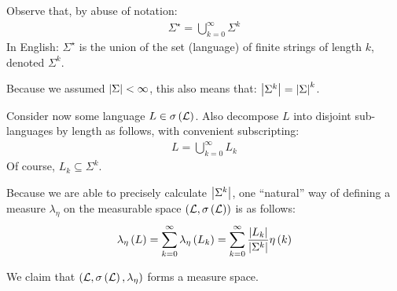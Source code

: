 \documentclass[12pt]{article}
\begin{document}
Observe that, by abuse of notation:
\begin{align*}
  \Sigma^\star =
    \bigcup_{k = 0}^{\infty} \Sigma^k
\end{align*}
In English: \(\Sigma^\star\) is the union of the set (language) of finite
strings of length \(k\), denoted \(\Sigma^k\).

Because we assumed \(\left\lvert\Sigma\right\rvert < \infty\), this also means that:
\(\left\lvert\Sigma^k\right\rvert = \left\lvert\Sigma\right\rvert^k\).

Consider now some language \(L \in \sigma\left(\mathcal{L}\right)\).
Also decompose \(L\) into disjoint sub-languages by length as follows,
with convenient subscripting:
\begin{align*}
  L = \bigcup_{k = 0}^{\infty} L_k
\end{align*}
Of course, \(L_k \subseteq \Sigma^k\).

Because we are able to precisely calculate \(\left\lvert\Sigma^k\right\rvert\),
one ``natural'' way of defining a measure \(\lambda_{\eta}\) on
the measurable space \(\left(\mathcal{L}, \sigma\left(\mathcal{L}\right)\right)\)
is as follows:
\begin{align*}
  \lambda_{\eta} \left(L\right)
    = \sum_{k = 0}^{\infty} \lambda_{\eta} \left(L_k\right)
    = \sum_{k = 0}^{\infty} \frac{\left\lvert L_k\right\rvert}{\left\lvert\Sigma^k\right\rvert} \eta\left(k\right)
\end{align*}

We claim that
\(\left(\mathcal{L}, \sigma\left(\mathcal{L}\right), \lambda_{\eta}\right)\)
forms a measure space.
\end{document}
